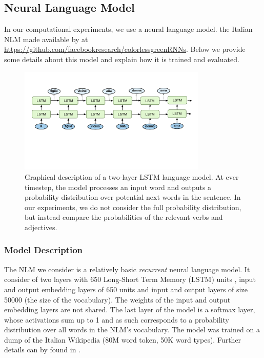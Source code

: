 \subsection{Neural Language Model}

In our computational experiments, we use a neural language model.
the Italian NLM made available by \citet{Gulordava:etal:2018} at \url{https://github.com/facebookresearch/colorlessgreenRNNs}.
Below we provide some details about this model and explain how it is trained and evaluated.

\begin{figure}
    \centering
    \includegraphics[width=0.8\textwidth, clip, trim={10mm 50mm 10mm 20mm}]{figures/LM-image}
    \caption{Graphical description of a two-layer LSTM language model. 
        At ever timestep, the model processes an input word and outputs a probability distribution over potential next words in the sentence.
    In our experiments, we do not consider the full probability distribution, but instead compare the probabilities of the relevant verbs and adjectives.
    }
\end{figure}

\subsubsection{Model Description}
The NLM we consider is a relatively basic \emph{recurrent} neural language model.
It consider of two layers with 650 Long-Short Term Memory (LSTM) units \citep{Hochreiter:Schmidhuber:1997}, input and output embedding layers of 650 units and input and output layers of size 50000 (the size of the vocabulary). The weights of the input and output embedding layers are not shared.
The last layer of the model is a softmax layer, whose activations sum up to 1 and as such corresponds to a probability distribution over all words in the NLM's vocabulary. 
The model was trained on a dump of the Italian Wikipedia (80M word token, 50K word types). 
Further details can by found in \citet{Gulordava:etal:2018}.

